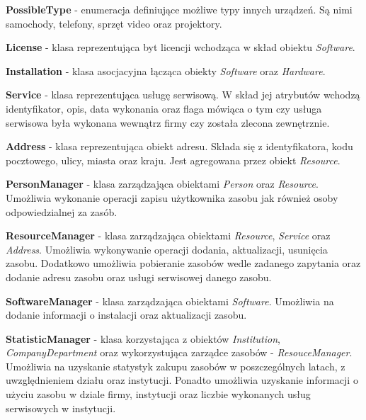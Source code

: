 \begin{description}
	\item \textbf{PossibleType} - enumeracja definiujące możliwe typy innych urządzeń. Są nimi samochody, telefony, sprzęt video oraz projektory.
	
	\item \textbf{License} - klasa reprezentująca byt licencji wchodząca w skład obiektu \textit{Software}.
	
	\item \textbf{Installation} - klasa asocjacyjna łącząca obiekty \textit{Software} oraz \textit{Hardware}.
	
	\item \textbf{Service} - klasa reprezentująca usługę serwisową. W skład jej atrybutów wchodzą identyfikator, opis, data wykonania oraz flaga mówiąca o tym czy usługa serwisowa była wykonana wewnątrz firmy czy została zlecona zewnętrznie.
	
	\item \textbf{Address} - klasa reprezentująca obiekt adresu. Składa się z identyfikatora, kodu pocztowego, ulicy, miasta oraz kraju. Jest agregowana przez obiekt \textit{Resource}.
	
	\item \textbf{PersonManager} - klasa zarządzająca obiektami \textit{Person} oraz \textit{Resource}. Umożliwia wykonanie operacji zapisu użytkownika zasobu jak również osoby odpowiedzialnej za zasób.
	
	\item \textbf{ResourceManager} - klasa zarządzająca obiektami \textit{Resource}, \textit{Service} oraz \textit{Address}. Umożliwia wykonywanie operacji dodania, aktualizacji, usunięcia zasobu. Dodatkowo umożliwia pobieranie zasobów wedle zadanego zapytania oraz dodanie adresu zasobu oraz usługi serwisowej danego zasobu. 
		
	\item \textbf{SoftwareManager} - klasa zarządzająca obiektami \textit{Software}. Umożliwia na dodanie informacji o instalacji oraz aktualizacji zasobu.
			
	\item \textbf{StatisticManager} - klasa korzystająca z obiektów \textit{Institution}, \textit{CompanyDepartment} oraz wykorzystująca zarządce zasobów - \textit{ResouceManager}. Umożliwia na uzyskanie statystyk zakupu zasobów w poszczególnych latach, z uwzględnieniem działu oraz instytucji. Ponadto umożliwia uzyskanie informacji o użyciu zasobu w dziale firmy, instytucji oraz liczbie wykonanych usług serwisowych w instytucji.
\end{description}